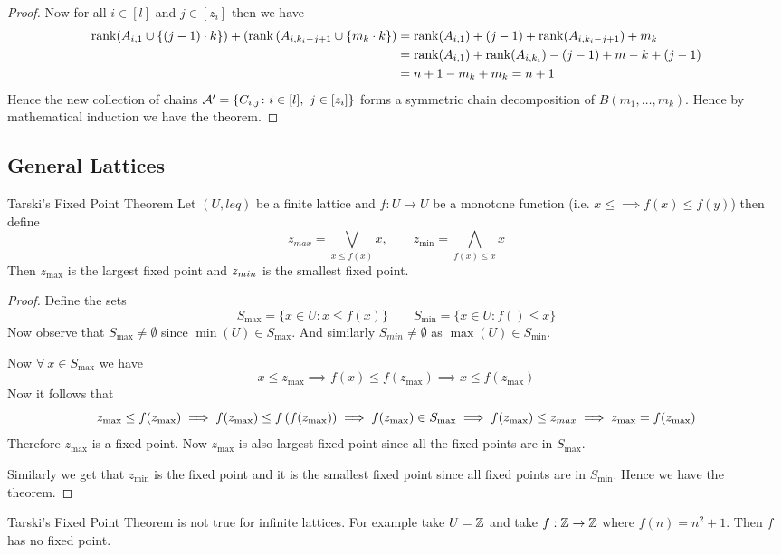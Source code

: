 \begin{proof}
Now for all $i\in[l]$ and  $j\in[z_i]$ then we have \begin{align*}
	\operatorname{rank}(A_{i,1}\cup\{(j-1)\cdot k\})+(\operatorname{rank} \left(A_{i,k_i-j+1}\cup\{m_k\cdot k\}\right)&= \operatorname{rank}(A_{i,1})+(j-1)+\operatorname{rank}(A_{i,k_i-j+1})+m_k\\
	& = \operatorname{rank}(A_{i,1})+\operatorname{rank}(A_{i,k_i})-(j-1)+m-k+(j-1)\\
	& = n+1-m_k+m_k=n+1
\end{align*}\parinn
Hence the new collection of chains $\mathcal{A}'=\{C_{i,j}\colon i\in[l],\ j\in[z_i]\}$ forms a symmetric chain decomposition of $B(m_1,\dots, m_k)$. Hence by mathematical induction we have the theorem.
\end{proof}
\subsection{General Lattices}


\begin{Theorem}{Tarski's Fixed Point Theorem}{}
	Let $(U,leq)$ be a finite lattice and $f:U\to U$ be a monotone function (i.e. $x\leq\implies f(x)\leq f(y)$) then define $$z_{max}=\bigvee_{x\leq f(x)}x,\qquad z_{\min}=\bigwedge_{f(x)\leq x}x$$Then $z_{\max}$ is the largest fixed point and $z_{\\min}$ is the smallest fixed point.
\end{Theorem}
\begin{proof}
	Define the sets $$S_{\max}=\{x\in U\colon x\leq f(x)\}\qquad S_{\min}=\{x\in U\colon f()\leq x\}$$Now observe that $S_{\max}\neq \emptyset$ since $\min(U)\in S_{\max}$. And similarly $S_{min}\neq\emptyset$ as $\max(U)\in S_{\min}$. 
	
	Now $\forall\ x\in S_{\max}$ we   have $$x\leq z_{\max}\implies f(x)\leq f(z_{\max})\implies x\leq f(z_{\max})$$Now it follows that $$z_{\max}\leq f(z_{\max})\implies f(z_{\max})\leq f\left(f(z_{\max})\right)\implies f(z_{\max})\in S_{\max} \implies f(z_{\max})\leq z_{max}\implies z_{\max}=f(z_{\max})$$Therefore $z_{\max}$ is a fixed point. Now $z_{\max}$ is also largest fixed point since all the fixed points are in $S_{\max}$.
	
	Similarly we get that $z_{\min}$ is the fixed point and it is the smallest fixed point since all fixed points are in $S_{\min}$. Hence we have the theorem. 
\end{proof}
\begin{remark}
	Tarski's Fixed Point Theorem is not true for infinite lattices. For example take $U=\mathbb{Z}$ and take $f:\mathbb{Z}\to \mathbb{Z}$ where $f(n)=n^2+1$. Then $f$ has no fixed point.
\end{remark}
